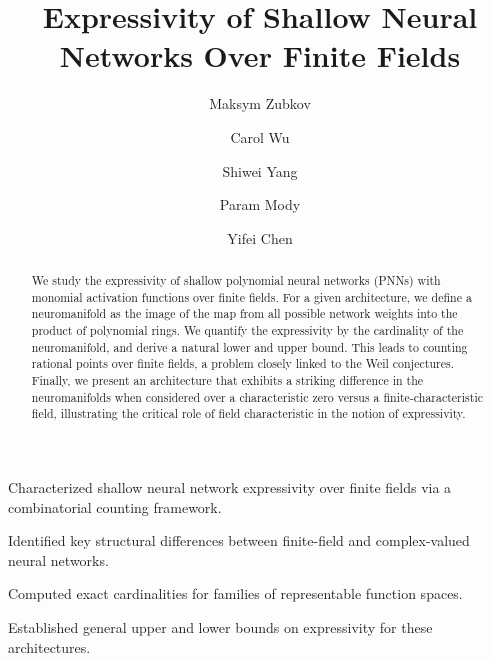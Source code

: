 \documentclass[a4paper]{cas-sc}
\begin{document}
\let\WriteBookmarks\relax
\def\floatpagepagefraction{1}
\def\textpagefraction{.001}


\title [mode = title]{Expressivity of Shallow Neural Networks Over Finite Fields}  
                
\tnotemark[1]

   
\author[1]{Maksym Zubkov}
\cormark[1]

\author[1]{Carol Wu}

\author[1]{Shiwei Yang}

\author[1]{Param Mody}

\author[1]{Yifei Chen}


\begin{abstract}
    We study the expressivity of shallow polynomial neural networks (PNNs) with monomial activation functions over finite fields. For a given architecture, we define a neuromanifold as the image of the map from all possible network weights into the product of polynomial rings. We quantify the expressivity by the cardinality of the neuromanifold, and derive a natural lower and upper bound. This leads to counting rational points over finite fields, a problem closely linked to the Weil conjectures. Finally, we present an architecture that exhibits a striking difference in the neuromanifolds when considered over a characteristic zero versus a finite‐characteristic field, illustrating the critical role of field characteristic in the notion of expressivity. 
\end{abstract}

\begin{highlights}
\item Characterized shallow neural network expressivity over finite fields via a combinatorial counting framework.
\item Identified key structural differences between finite-field and complex-valued neural networks.
\item Computed exact cardinalities for families of representable function spaces.
\item Established general upper and lower bounds on expressivity for these architectures.
\end{highlights}
\end{document}
